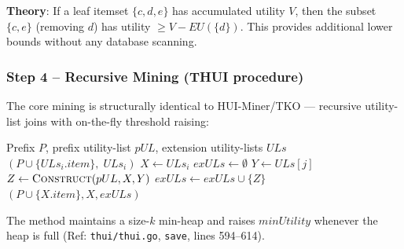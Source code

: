\textbf{Theory}: If a leaf itemset $\{c,d,e\}$ has accumulated utility $V$, then the subset $\{c,e\}$ (removing $d$) has utility $\geq V - EU(\{d\})$. This provides additional lower bounds without any database scanning.

\subsubsection{Step 4 -- Recursive Mining (THUI procedure)}

The core mining is structurally identical to HUI-Miner/TKO --- recursive utility-list joins with on-the-fly threshold raising:

\begin{algorithm}[H]
\caption{THUI Recursive Mining (Ref: \texttt{thui/thui.go}, \texttt{thui}, lines 488--522)}
\label{alg:thui_mine}
\begin{algorithmic}[1]
\Require Prefix $P$, prefix utility-list $pUL$, extension utility-lists $ULs$
 
        \State {}$(P \cup \{ULs_i.item\},\; ULs_i)$
    \EndIf
\EndFor
{} 
    \State $X \leftarrow ULs_i$
     
        \State $exULs \leftarrow \emptyset$
            \State $Y \leftarrow ULs[j]$
            \State $Z \leftarrow \textproc{Construct}(pUL, X, Y)$ 
                \State $exULs \leftarrow exULs \cup \{Z\}$
            \EndIf
        \EndFor
        \State {}$(P \cup \{X.item\}, X, exULs)$ 
    \EndIf
\EndFor
\end{algorithmic}
\end{algorithm}

The  method maintains a size-$k$ min-heap and raises $minUtility$ whenever the heap is full (Ref: \texttt{thui/thui.go}, \texttt{save}, lines 594--614).
